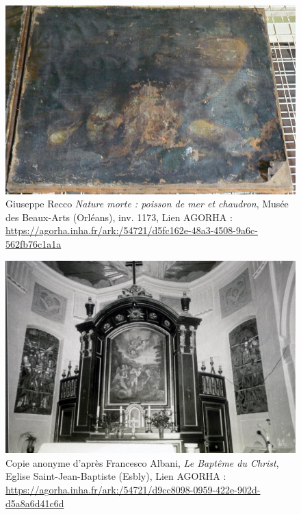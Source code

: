 \begin{figure}[H]
    \centering
    \includegraphics[height=0.3\textheight]{annexes/figures/ptrRecco.jpg}
    \caption{Giuseppe Recco \textit{Nature morte : poisson de mer et chaudron}, Musée des Beaux-Arts (Orléans), inv. 1173, Lien AGORHA : \\ \url{https://agorha.inha.fr/ark:/54721/d5fc162e-48a3-4508-9a6c-562fb76c1a1a}}
    \label{fig:ptrRecco}
\end{figure}


\begin{figure}[H]
    \centering
    \includegraphics[height=0.4\textheight]{annexes/figures/ptrAlbani.jpg}
    \caption{Copie anonyme d'après Francesco Albani, \textit{Le Baptême du Christ}, Eglise Saint-Jean-Baptiste (Esbly), Lien AGORHA : \\ \url{https://agorha.inha.fr/ark:/54721/d9cc8098-0959-422e-902d-d5a8a6d41c6d}}
    \label{fig:ptrAlbani}
\end{figure}




